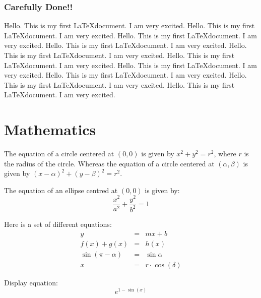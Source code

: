 \documentclass[a4paper,11pt]{article}
\begin{document}
\subsubsection{Carefully Done!!}
Hello. This is my first \LaTeX document. I am very excited. Hello. This is my first \LaTeX document. I am very excited. Hello. This is my first \LaTeX document. I am very excited. Hello. This is my first \LaTeX document. I am very excited. Hello. This is my first \LaTeX document. I am very excited. Hello. This is my first \LaTeX document. I am very excited. Hello. This is my first \LaTeX document. I am very excited. Hello. This is my first \LaTeX document. I am very excited. Hello. This is my first \LaTeX document. I am very excited. Hello. This is my first \LaTeX document. I am very excited.


\section{Mathematics}

The equation of a circle centered at $(0,0)$ is given by $x^2+y^2=r^2$, where $r$ is the radius of the circle. Whereas the equation of a circle centered at $(\alpha,\beta)$ is given by $(x-\alpha)^2+(y-\beta)^2=r^2$.

The equation of an ellipse centred at $(0,0)$ is given by:
\begin{equation}
\frac{x^2}{a^2}+\frac{y^2}{b^2}=1 
\end{equation}

Here is a set of different equations:
\begin{eqnarray}
y &= & mx+b \nonumber \\
f(x)+g(x) &= & h(x) \nonumber \\
\sin(\pi - \alpha) &= & \sin \alpha \nonumber \\
x &= & r \cdot \cos(\delta)
\end{eqnarray}

Display equation:
\begin{equation}
e^{1-\sin(x)}
\end{equation}
\end{document}
